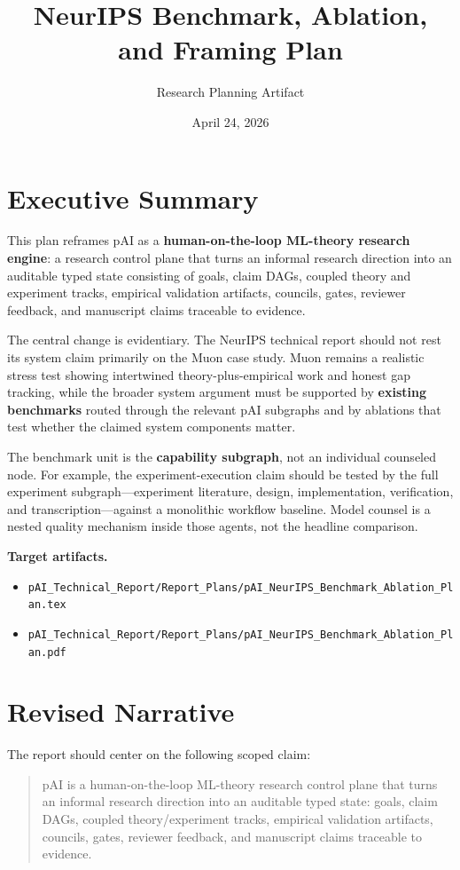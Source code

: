 \documentclass[11pt]{article}
\title{\pai{} NeurIPS Benchmark, Ablation, and Framing Plan}
\author{Research Planning Artifact}
\date{April 24, 2026}
\newcommand{\pai}{pAI}
\begin{document}
\maketitle

\section*{Executive Summary}

This plan reframes \pai{} as a \textbf{human-on-the-loop ML-theory research engine}: a research control plane that turns an informal research direction into an auditable typed state consisting of goals, claim DAGs, coupled theory and experiment tracks, empirical validation artifacts, councils, gates, reviewer feedback, and manuscript claims traceable to evidence.

The central change is evidentiary. The NeurIPS technical report should not rest its system claim primarily on the Muon case study. Muon remains a realistic stress test showing intertwined theory-plus-empirical work and honest gap tracking, while the broader system argument must be supported by \textbf{existing benchmarks} routed through the relevant \pai{} subgraphs and by ablations that test whether the claimed system components matter.

The benchmark unit is the \textbf{capability subgraph}, not an individual counseled node. For example, the experiment-execution claim should be tested by the full experiment subgraph---experiment literature, design, implementation, verification, and transcription---against a monolithic workflow baseline. Model counsel is a nested quality mechanism inside those agents, not the headline comparison.

\textbf{Target artifacts.}
\begin{itemize}
  \item \texttt{pAI\_Technical\_Report/Report\_Plans/pAI\_NeurIPS\_Benchmark\_Ablation\_Plan.tex}
  \item \texttt{pAI\_Technical\_Report/Report\_Plans/pAI\_NeurIPS\_Benchmark\_Ablation\_Plan.pdf}
\end{itemize}

\section*{Revised Narrative}

The report should center on the following scoped claim:

\begin{quote}
\pai{} is a human-on-the-loop ML-theory research control plane that turns an informal research direction into an auditable typed state: goals, claim DAGs, coupled theory/experiment tracks, empirical validation artifacts, councils, gates, reviewer feedback, and manuscript claims traceable to evidence.
\end{quote}
\end{document}
